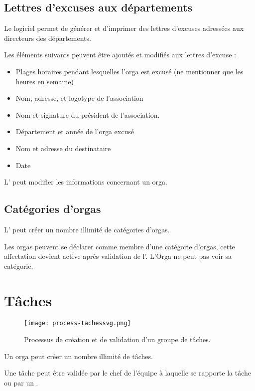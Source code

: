 \subsection{Lettres d'excuses aux départements}
Le logiciel permet de générer et d'imprimer des lettres d'excuses adressées aux directeurs des départements.

Les éléments suivants peuvent être ajoutés et modifiés aux lettres d'excuse : 
\begin{itemize}
\item Plages horaires pendant lesquelles l'orga est excusé (ne mentionner que les heures en semaine)
 \item Nom, adresse, et logotype de l'association
\item Nom et signature du président de l'association.
\item Département et année de l'orga excusé
\item Nom et adresse du destinataire
\item Date
\end{itemize}


L' \oh{} peut modifier les informations concernant un orga.


\subsection{Catégories d'orgas}
L'\oh{} peut créer un nombre illimité de catégories d'orgas.

Les orgas peuvent se déclarer comme membre d'une catégorie d'orgas, cette affectation devient active après validation de l'\oh{}. L'Orga ne peut pas voir sa catégorie.

\section{Tâches}

\begin{figure}[h!t]
\centering
\texttt{[image: process-tachessvg.png]}
\label{fig:ptaches}
\caption{Processus de création et de validation d'un groupe de tâches.}
\end{figure}


Un orga peut créer un nombre illimité de tâches.

Une tâche peut être validée par le chef de l'équipe à laquelle se rapporte la tâche ou par un \oh{}.

